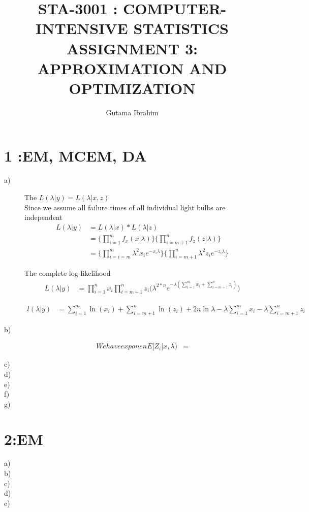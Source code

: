\documentclass{article}
\title{STA-3001 : COMPUTER-INTENSIVE STATISTICS ASSIGNMENT 3: APPROXIMATION AND OPTIMIZATION}
\author{Gutama Ibrahim}
\begin{document}
\maketitle

\section*{1 :EM, MCEM, DA}


\begin{description}
	\item[a)]
		The $L(\lambda|y)=L(\lambda|x,z)$\\
	Since we assume all failure times of all individual light bulbs are independent\\
	\begin{align*}
		L(\lambda|y)&=L(\lambda|x)*L(\lambda|z)\\
				&=\{\prod_{i=1}^m f_x(x|\lambda)\}\{\prod_{i=m+1}^n f_z(z|\lambda)\}\\
			&=\{\prod_{i=i=m}^m \lambda^2 x_i e^{-x_i\lambda} \}\{ \prod_{i=m+1}^n \lambda^2 z_i e^{-z_i \lambda}\}
	\end{align*}


The complete log-likelihood
	\begin{align*}
		L(\lambda|y)&=\prod_{i=1}^n x_i \prod_{i=m+1}^n z_i\bigg(\lambda^{2*n} e^{-\lambda(\sum_{i=1}^m x_i +\sum_{i=m+1}^n z_i)} \bigg)
	\end{align*}

	\begin{align*}
		l(\lambda|y)&=\sum_{i=1}^m \ln(x_i)+\sum_{i=m+1}^n \ln(z_i) + 2n \ln \lambda - \lambda \sum_{i=1}^m x_i -\lambda \sum_{i=m+1}^n z_i
	\end{align*}	
			
	\item[b)]
		\begin{align*}
		We have exponen
		E[Z_i|x,\lambda)&=
		\end{align*}
	\item[c)]
	\item[d)]
	\item[e)]
	\item[f)]
	\item[g)]
		
\end{description}

\section*{2:EM}
\begin{description}
	\item[a)]
	\item[b)]
	\item[c)]
	\item[d)]
	\item[e)]
\end{description}
\end{document}
